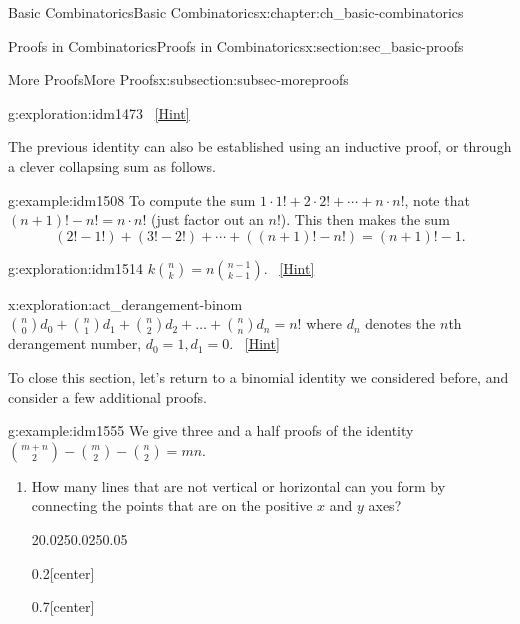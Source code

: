 \documentclass[oneside,10pt,]{book}
\numberwithin{equation}{chapter}
\begin{document}
\begin{chapterptx}{Basic Combinatorics}{}{Basic Combinatorics}{}{}{x:chapter:ch_basic-combinatorics}
\begin{sectionptx}{Proofs in Combinatorics}{}{Proofs in Combinatorics}{}{}{x:section:sec_basic-proofs}
\begin{subsectionptx}{More Proofs}{}{More Proofs}{}{}{x:subsection:subsec-moreproofs}
\begin{exploration}{}{g:exploration:idm1473}
\qquad~\hfill{\tiny\hyperlink{g:hint:idm1477-back}{[Hint]}}\end{exploration}
The previous identity can also be established using an inductive proof, or through a clever collapsing sum as follows.%
\begin{example}{}{g:example:idm1508}%
To compute the sum \(1\cdot 1! + 2 \cdot 2! + \cdots + n \cdot n!\), note that \((n+1)! - n! = n\cdot n!\) (just factor out an \(n!\)).  This then makes the sum%
\begin{equation*}
(2! - 1!) + (3! - 2!) + \cdots + ((n+1)! - n!) = (n+1)! - 1 \text{.}
\end{equation*}
%
\end{example}
\begin{exploration}{}{g:exploration:idm1514}%
\(k \binom{n}{k} = n \binom{n - 1}{k - 1}\).%
\qquad~\hfill{\tiny\hyperlink{g:hint:idm1518-back}{[Hint]}}\end{exploration}
\begin{exploration}{}{x:exploration:act_derangement-binom}%
\(\binom{n}{0} d_{0} + \binom{n}{1} d_{1} + \binom{n}{2} d_{2} + \ldots + \binom{n}{n} d_{n} = n!\) where \(d_{n}\) denotes the \(n\)th derangement number, \(d_{0} = 1,d_{1} = 0\).%
\qquad~\hfill{\tiny\hyperlink{g:hint:idm1541-back}{[Hint]}}\end{exploration}
To close this section, let's return to a binomial identity we considered before, and consider a few additional proofs.%
\begin{example}{}{g:example:idm1555}%
We give three and a half proofs of the identity \(\binom{m + n}{2} - \binom{m}{2} - \binom{n}{2} = mn\).%
\begin{enumerate}
\item{}How many lines that are not vertical or horizontal can you form by connecting the points that are on the positive \(x\) and \(y\) axes?%
\begin{sidebyside}{2}{0.025}{0.025}{0.05}%
\begin{sbspanel}{0.2}[center]%
%
\end{sbspanel}%
\begin{sbspanel}{0.7}[center]%

\end{sbspanel}
\end{sidebyside}
\end{enumerate}
\end{example}
\end{subsectionptx}
\end{sectionptx}
\end{chapterptx}
\end{document}

